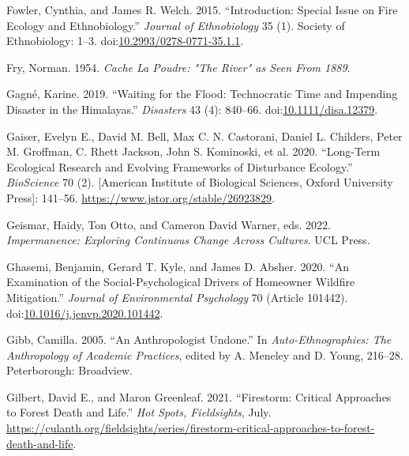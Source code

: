 \documentclass[
]{article}
\newlength{\cslhangindent}
\newenvironment{CSLReferences}[2] %
 {\begin{list}{}{%
  \setlength{\itemindent}{0pt}
  \setlength{\leftmargin}{0pt}
  \setlength{\parsep}{0pt}
  \ifodd #1
   \setlength{\leftmargin}{\cslhangindent}
   \setlength{\itemindent}{-1\cslhangindent}
  \fi
  \setlength{\itemsep}{#2\baselineskip}}}
 {\end{list}}
\begin{document}
\begin{CSLReferences}{1}{0}
Fowler, Cynthia, and James R. Welch. 2015. {``Introduction: {Special Issue} on {Fire Ecology} and {Ethnobiology}.''} \emph{Journal of Ethnobiology} 35 (1). Society of Ethnobiology: 1--3. doi:\href{https://doi.org/10.2993/0278-0771-35.1.1}{10.2993/0278-0771-35.1.1}.

Fry, Norman. 1954. \emph{Cache La {Poudre}: "{The River}" as {Seen From} 1889}.

Gagné, Karine. 2019. {``Waiting for the Flood: Technocratic Time and Impending Disaster in the {Himalayas}.''} \emph{Disasters} 43 (4): 840--66. doi:\href{https://doi.org/10.1111/disa.12379}{10.1111/disa.12379}.

Gaiser, Evelyn E., David M. Bell, Max C. N. Castorani, Daniel L. Childers, Peter M. Groffman, C. Rhett Jackson, John S. Kominoski, et al. 2020. {``Long-{Term Ecological Research} and {Evolving Frameworks} of {Disturbance Ecology}.''} \emph{BioScience} 70 (2). {[}American Institute of Biological Sciences, Oxford University Press{]}: 141--56. \url{https://www.jstor.org/stable/26923829}.

Geismar, Haidy, Ton Otto, and Cameron David Warner, eds. 2022. \emph{Impermanence: {Exploring Continuous Change} Across {Cultures}}. UCL Press.

Ghasemi, Benjamin, Gerard T. Kyle, and James D. Absher. 2020. {``An Examination of the Social-Psychological Drivers of Homeowner Wildfire Mitigation.''} \emph{Journal of Environmental Psychology} 70 (Article 101442). doi:\href{https://doi.org/10.1016/j.jenvp.2020.101442}{10.1016/j.jenvp.2020.101442}.

Gibb, Camilla. 2005. {``An {Anthropologist Undone}.''} In \emph{Auto-{Ethnographies}: The {Anthropology} of {Academic Practices}}, edited by A. Meneley and D. Young, 216--28. Peterborough: Broadview.

Gilbert, David E., and Maron Greenleaf. 2021. {``Firestorm: {Critical Approaches} to {Forest Death} and {Life}.''} \emph{Hot Spots, Fieldsights}, July. \url{https://culanth.org/fieldsights/series/firestorm-critical-approaches-to-forest-death-and-life}.


\end{CSLReferences}
\end{document}

